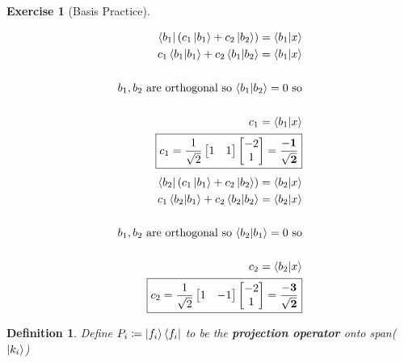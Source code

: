 \documentclass[12pt]{article}
\theoremstyle{plain}
\theoremstyle{nonumberplain}
\theoremstyle{plain}
\newtheorem{definition}[lemma]{Definition}
\newtheorem{exercise}[lemma]{Exercise}
\theoremstyle{nonumberplain}
\newcommand\1{{\bf 1}}
\newcommand{\bmat}[1]{\begin{bmatrix*} #1 \end{bmatrix*}} %
\newcommand{\<}{\left\langle}
\renewcommand{\>}{\right\rangle}
\begin{document}
\begin{exercise}  [Basis Practice]
\begin{enumerate}
\begin{enumerate}
\begin{equation*}
\begin{split}
	\bra{b_1}(c_1\ket{b_1} + c_2\ket{b_2}) = \braket{b_1|x}\\
	c_1\braket{b_1|b_1} + c_2\braket{b_1|b_2} = \braket{b_1|x}\\\\
	\text{$b_1, b_2$ are orthogonal so $\braket{b_1|b_2} = 0$ so}\\\\
	c_1 = \braket{b_1|x}\\
	\boxed{c_1 = \frac{1}{\sqrt{2}} \bmat{1&1}\bmat{-2\\ 1} = \mathbf{\frac{-1}{\sqrt{2}}}}
	\end{split}	
	\end{equation*}
	\begin{equation*}
	\begin{split}
	\bra{b_2}(c_1\ket{b_1} + c_2\ket{b_2}) = \braket{b_2|x}\\
	c_1\braket{b_2|b_1} + c_2\braket{b_2|b_2} = \braket{b_2|x}\\\\
	\text{$b_1, b_2$ are orthogonal so $\braket{b_2|b_1} = 0$ so}\\\\
	c_2 = \braket{b_2|x}\\
	\boxed{c_2 = \frac{1}{\sqrt{2}} \bmat{1&-1}\bmat{-2\\ 1} = \mathbf{\frac{-3}{\sqrt{2}}}}
	\end{split}	
	\end{equation*}
	\end{enumerate}
\end{enumerate}
\end{exercise}
\pagebreak
\begin{definition}
Define $P_i \coloneqq \ket{f_i}\bra{f_i}$ to be the \textbf{projection operator} onto span($\ket{k_i}$)
\end{definition}
\end{document}
